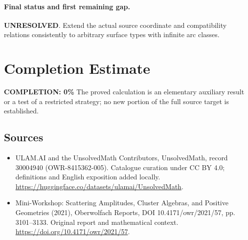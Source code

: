 \documentclass[11pt]{article}
\begin{document}
\paragraph{Final status and first remaining gap.}
\textbf{UNRESOLVED}. Extend the actual source coordinate and compatibility relations consistently to arbitrary surface types with infinite arc classes.

\section{Completion Estimate}
\noindent\textbf{COMPLETION: 0\%}
The proved calculation is an elementary auxiliary result or a test of a restricted strategy; no new portion of the full source target is established.

\subsection{Sources}
\begin{itemize}
\item[\hypertarget{source:30004940:1}{S1}] ULAM.AI and the UnsolvedMath Contributors, UnsolvedMath, record 30004940 (OWR-8415362-005). Catalogue curation under CC BY 4.0; definitions and English exposition added locally.
\url{https://huggingface.co/datasets/ulamai/UnsolvedMath}.
\item[\hypertarget{source:30004940:2}{S2}] Mini-Workshop: Scattering Amplitudes, Cluster Algebras, and Positive Geometries (2021), Oberwolfach Reports, DOI 10.4171/owr/2021/57, pp. 3101--3133. Original report and mathematical context.
\url{https://doi.org/10.4171/owr/2021/57}.
\end{itemize}
\label{end:30004940}
\end{document}
